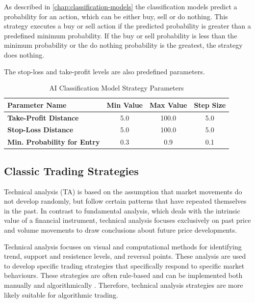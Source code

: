 As described in \autoref{chap:classification-models} the classification models predict a probability for an action, which can be either buy, sell or do nothing.
This strategy executes a buy or sell action if the predicted probability is greater than a predefined minimum probability.
If the buy or sell probability is less than the minimum probability or the do nothing probability is the greatest, the strategy does nothing.

The stop-loss and take-profit levels are also predefined parameters.

\begin{table}[H]
    \centering
    \begin{tabular}{L{4cm}ccc}
        \toprule
        Parameter Name & Min Value & Max Value & Step Size
        \\
        \midrule
        \textbf{Take-Profit Distance}       & 5.0 & 100.0 & 5.0 \\
        \textbf{Stop-Loss Distance}         & 5.0 & 100.0 & 5.0 \\
        \textbf{Min. Probability for Entry} & 0.3 & 0.9   & 0.1 \\
        \bottomrule
    \end{tabular}
    \caption{AI Classification Model Strategy Parameters}
    \label{tbl:classification-strategy-parameters}
\end{table}

\subsection{Classic Trading Strategies}

Technical analysis (TA) is based on the assumption that market movements do not develop randomly, but follow certain patterns that have repeated themselves in the past.
In contrast to fundamental analysis, which deals with the intrinsic value of a financial instrument, technical analysis focuses exclusively on past price and volume movements to draw conclusions about future price developments.

Technical analysis focuses on visual and computational methods for identifying trend, support and resistence levels, and reversal points.
These analysis are used to develop specific trading strategies that specifically respond to specific market behaviours.
These strategies are often rule-based and can be implemented both manually and algorithmically \cite{ta-basics}.
Therefore, technical analysis strategies are more likely suitable for algorithmic trading.

